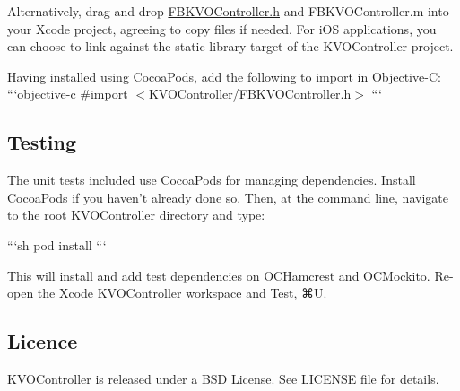 Alternatively, drag and drop \hyperlink{_f_b_k_v_o_controller_8h_source}{F\+B\+K\+V\+O\+Controller.\+h} and F\+B\+K\+V\+O\+Controller.\+m into your Xcode project, agreeing to copy files if needed. For i\+O\+S applications, you can choose to link against the static library target of the K\+V\+O\+Controller project.

Having installed using Cocoa\+Pods, add the following to import in Objective-\/\+C\+: ```objective-\/c \#import $<$\hyperlink{_f_b_k_v_o_controller_8h_source}{K\+V\+O\+Controller/\+F\+B\+K\+V\+O\+Controller.\+h}$>$ ```

\subsection*{Testing}

The unit tests included use Cocoa\+Pods for managing dependencies. Install Cocoa\+Pods if you haven't already done so. Then, at the command line, navigate to the root K\+V\+O\+Controller directory and type\+:

```sh pod install ```

This will install and add test dependencies on O\+C\+Hamcrest and O\+C\+Mockito. Re-\/open the Xcode K\+V\+O\+Controller workspace and Test, ⌘\+U.

\subsection*{Licence}

K\+V\+O\+Controller is released under a B\+S\+D License. See L\+I\+C\+E\+N\+S\+E file for details. 